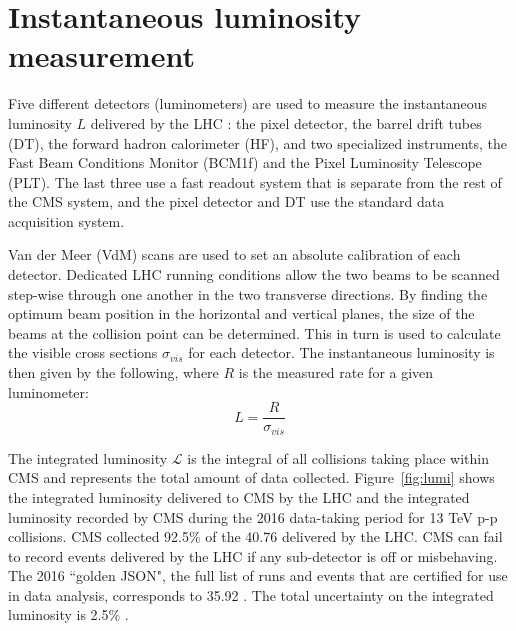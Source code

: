 \section{Instantaneous luminosity measurement}
\label{sec:lumi}

Five different detectors (luminometers) are used to measure the instantaneous luminosity $L$ delivered by the LHC \cite{lumiPAS}: the pixel detector, the barrel drift tubes (DT), the forward hadron calorimeter (HF), and two specialized instruments, the Fast Beam Conditions Monitor (BCM1f) and the Pixel Luminosity Telescope (PLT). The last three use a fast readout system that is separate from the rest of the CMS system, and the pixel detector and DT use the standard data acquisition system. 

Van der Meer (VdM) scans \cite{VanderMeer} are used to set an absolute calibration of each detector. Dedicated LHC running conditions allow the two beams to be scanned step-wise through one another in the two transverse directions. By finding the optimum beam position in the horizontal and vertical planes, the size of the beams at the collision point can be determined. This in turn is used to calculate the visible cross sections $\sigma_{vis}$ for each detector. The instantaneous luminosity is then given by the following, where $R$ is the measured rate for a given luminometer:
\begin{equation}
L = \frac{R}{\sigma_{vis}}
\end{equation}

The integrated luminosity $\mathcal{L}$ is the integral of all collisions taking place within CMS and represents the total amount of data collected. Figure~\ref{fig:lumi} shows the integrated luminosity delivered to CMS by the LHC and the integrated luminosity recorded by CMS during the 2016 data-taking period for 13 TeV p-p collisions. CMS collected 92.5\% of the 40.76 \fbinv delivered by the LHC. CMS can fail to record events delivered by the LHC if any sub-detector is off or misbehaving. The 2016 ``golden JSON", the full list of runs and events that are certified for use in data analysis, corresponds to 35.92 \fbinv. The total uncertainty on the integrated luminosity is 2.5\% \cite{lumiPAS}.

